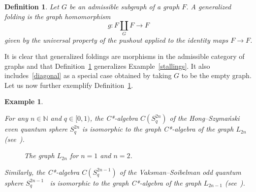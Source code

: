 \documentclass[12pt,times,a4paper]{amsart}
\newtheorem{example}[theorem]{Example}
\newtheorem{definition}[theorem]{Definition}
\numberwithin{equation}{section}
\numberwithin{equation}{section}
\begin{document}
\begin{definition}\label{genfold}
Let $G$ be an admissible subgraph of a graph $F$.
A {\em generalized folding} is the graph homomorphism
\begin{equation}\label{foldeq}
g:F\underset{G}{\amalg}F\longrightarrow F
\end{equation}
given by the universal property of the pushout applied to the identity maps $F\to F$.
\end{definition}
\noindent It is clear that generalized foldings are morphisms in the admissible category of graphs and that Definition~\ref{genfold} 
generalizes Example~\ref{stallings}. It also includes~\eqref{diagonal} as a special case obtained by taking $G$ to be the empty graph. Let us now further exemplify Definition~\ref{genfold}.
\begin{example}\label{quantsphere}
{\rm 
For any $n\in\mathbb{N}$ and $q\in [0,1)$, the C*-algebra $C(S^{2n}_q)$ of the Hong--Szyma\'nski even quantum sphere $S_q^{2n}$ 
is isomorphic to the graph C*-algebra of the graph $L_{2n}$ (see~\cite[Section~5.1]{hs02}).

\begin{figure}[h]
\qquad
{}
\caption{The graph $L_{2n}$ for $n=1$ and $n=2$.}
\end{figure}
\noindent Similarly, the C*-algebra $C(S^{2n-1}_q)$ of the Vaksman--Soibelman odd quantum sphere $S^{2n-1}_q$~\cite{vs90} 
is isomorphic to the graph C*-algebra of the graph $L_{2n-1}$ (see~\cite[Section~4.1]{hs02}).%

}
\end{example}
\end{document}
